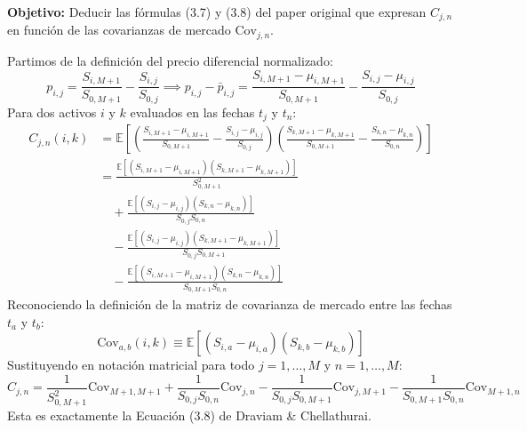 \documentclass[11pt,a4paper]{report}
\numberwithin{equation}{chapter}
\begin{document}
\begin{demobox}
\textbf{Objetivo:} Deducir las fórmulas (3.7) y (3.8) del paper original que expresan $C_{j,n}$ en función de las covarianzas de mercado $\mathrm{Cov}_{j,n}$.

Partimos de la definición del precio diferencial normalizado:
\begin{equation}
    p_{i,j} = \frac{S_{i,M+1}}{S_{0,M+1}} - \frac{S_{i,j}}{S_{0,j}} \implies p_{i,j} - \bar{p}_{i,j} = \frac{S_{i,M+1} - \mu_{i,M+1}}{S_{0,M+1}} - \frac{S_{i,j} - \mu_{i,j}}{S_{0,j}}
\end{equation}
Para dos activos $i$ y $k$ evaluados en las fechas $t_j$ y $t_n$:
\begin{align}
    C_{j,n}(i,k) &= \mathbb{E}\left[ \left( \frac{S_{i,M+1} - \mu_{i,M+1}}{S_{0,M+1}} - \frac{S_{i,j} - \mu_{i,j}}{S_{0,j}} \right) \left( \frac{S_{k,M+1} - \mu_{k,M+1}}{S_{0,M+1}} - \frac{S_{k,n} - \mu_{k,n}}{S_{0,n}} \right) \right] \nonumber \\
    &= \frac{\mathbb{E}[(S_{i,M+1} - \mu_{i,M+1})(S_{k,M+1} - \mu_{k,M+1})]}{S_{0,M+1}^2} \nonumber \\
    &\quad + \frac{\mathbb{E}[(S_{i,j} - \mu_{i,j})(S_{k,n} - \mu_{k,n})]}{S_{0,j} S_{0,n}} \nonumber \\
    &\quad - \frac{\mathbb{E}[(S_{i,j} - \mu_{i,j})(S_{k,M+1} - \mu_{k,M+1})]}{S_{0,j} S_{0,M+1}} \nonumber \\
    &\quad - \frac{\mathbb{E}[(S_{i,M+1} - \mu_{i,M+1})(S_{k,n} - \mu_{k,n})]}{S_{0,M+1} S_{0,n}}
\end{align}
Reconociendo la definición de la matriz de covarianza de mercado entre las fechas $t_a$ y $t_b$:
\begin{equation}
    \mathrm{Cov}_{a,b}(i,k) \equiv \mathbb{E}\left[ (S_{i,a} - \mu_{i,a})(S_{k,b} - \mu_{k,b}) \right]
\end{equation}
Sustituyendo en notación matricial para todo $j=1,\dots,M$ y $n=1,\dots,M$:
\begin{equation}
    \boxed{C_{j,n} = \frac{1}{S_{0,M+1}^2} \mathrm{Cov}_{M+1,M+1} + \frac{1}{S_{0,j} S_{0,n}} \mathrm{Cov}_{j,n} - \frac{1}{S_{0,j} S_{0,M+1}} \mathrm{Cov}_{j,M+1} - \frac{1}{S_{0,M+1} S_{0,n}} \mathrm{Cov}_{M+1,n}}
\end{equation}
Esta es exactamente la Ecuación (3.8) de Draviam \& Chellathurai.


\end{demobox}
\end{document}

